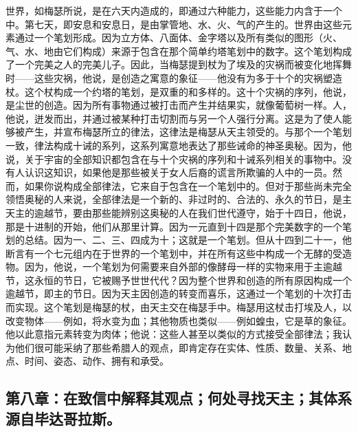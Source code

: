世界，如梅瑟所说，是在六天内造成的，即通过六种能力，这些能力内含于一个中。第七天，即安息和安息日，是由掌管地、水、火、气的产生的。世界由这些元素通过一个笔划形成。因为立方体、八面体、金字塔以及所有类似的图形（火、气、水、地由它们构成）来源于包含在那个简单约塔笔划中的数字。这个笔划构成了一个完美之人的完美儿子。因此，当梅瑟提到杖为了埃及的灾祸而被变化地挥舞时——这些灾祸，他说，是创造之寓意的象征——他没有为多于十个的灾祸塑造杖。这个杖构成一个约塔的笔划，是双重的和多样的。这十个灾祸的序列，他说，是尘世的创造。因为所有事物通过被打击而产生并结果实，就像葡萄树一样。人，他说，迸发而出，并通过被某种打击切割而与另一个人强行分离。这是为了使人能够被产生，并宣布梅瑟所立的律法，这律法是梅瑟从天主领受的。与那个一个笔划一致，律法构成十诫的系列，这系列寓意地表达了那些诫命的神圣奥秘。因为，他说，关于宇宙的全部知识都包含在与十个灾祸的序列和十诫系列相关的事物中。没有人认识这知识，如果他是那些被关于女人后裔的谎言所欺骗的人中的一员。然而，如果你说构成全部律法，它来自于包含在一个笔划中的。但对于那些尚未完全领悟奥秘的人来说，全部律法是一个新的、非过时的、合法的、永久的节日，是主天主的逾越节，要由那些能辨别这奥秘的人在我们世代遵守，始于十四日，他说，那是十进制的开始，他们从那里计算。因为一元直到十四是那个完美数字的一个笔划的总结。因为一、二、三、四成为十；这就是一个笔划。但从十四到二十一，他断言有一个七元组内在于世界的一个笔划中，并在所有这些中构成一个无酵的受造物。因为，他说，一个笔划为何需要来自外部的像酵母一样的实物来用于主逾越节，这永恒的节日，它被赐予世世代代？因为整个世界和创造的所有原因构成一个逾越节，即主的节日。因为天主因创造的转变而喜乐，这通过一个笔划的十次打击而实现。这个笔划是梅瑟的杖，由天主交在梅瑟手中。梅瑟用这杖击打埃及人，以改变物体——例如，将水变为血；其他物质也类似——例如蝗虫，它是草的象征。他以此意指元素转变为肉体；他说：这些人甚至以类似的方式接受全部律法；我认为他们很可能采纳了那些希腊人的观点，即肯定存在实体、性质、数量、关系、地点、时间、姿态、动作、拥有和承受。\par


\subsection{第八章：在致信中解释其观点；何处寻找天主；其体系源自毕达哥拉斯。}

